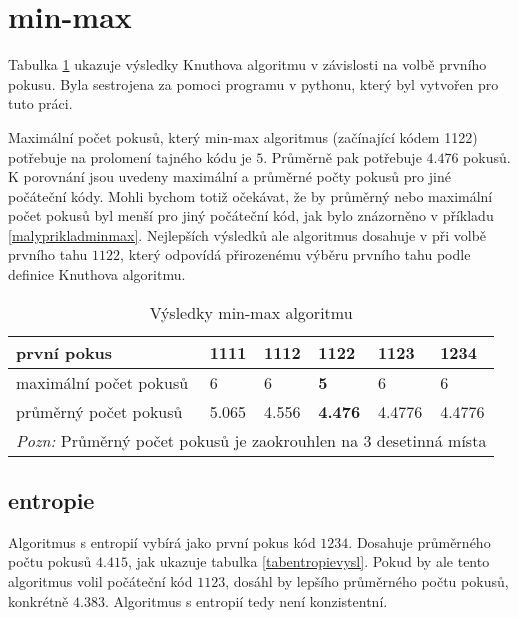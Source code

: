 \section{min-max}

Tabulka \ref{tabminmaxvysl} ukazuje výsledky Knuthova algoritmu v závislosti na volbě prvního pokusu. Byla sestrojena za pomoci programu v pythonu, který byl vytvořen pro tuto práci. \cite{Simsa_Strategies_for_Mastermind_2025} 

Maximální počet pokusů, který min-max algoritmus (začínající kódem 1122) potřebuje na prolomení tajného kódu je $5$. Průměrně pak potřebuje $4.476$ pokusů. K porovnání jsou uvedeny maximální a průměrné počty pokusů pro jiné počáteční kódy. Mohli bychom totiž očekávat, že by průměrný nebo maximální počet pokusů byl menší pro jiný počáteční kód, jak bylo znázorněno v příkladu \ref{malyprikladminmax}. Nejlepších výsledků ale algoritmus dosahuje v při volbě prvního tahu $1122$, který odpovídá přirozenému výběru prvního tahu podle definice Knuthova algoritmu. 

\begin{table}[h]
\centering
\begin{tabular}{l l l l l l}
\toprule
první pokus & 1111 & 1112 & \textbf{1122} & 1123 & 1234 \\
\midrule

maximální počet pokusů 
& 6 & 6 & \textbf{5} & 6 & 6 \\

průměrný počet pokusů 
& 5.065 & 4.556 & \textbf{4.476} & 4.4776 & 4.4776\\
\bottomrule
\multicolumn{6}{l}{\footnotesize \textit{Pozn:}
Průměrný počet pokusů je zaokrouhlen na $3$ desetinná místa}
\end{tabular}
\caption{Výsledky min-max algoritmu}\label{tabminmaxvysl}
\end{table}

\subsection{entropie}

Algoritmus s entropií vybírá jako první pokus kód $1234$. Dosahuje průměrného počtu pokusů $4.415$, jak ukazuje tabulka \ref{tabentropievysl}. Pokud by ale tento algoritmus volil počáteční kód $1123$, dosáhl by lepšího průměrného počtu pokusů, konkrétně $4.383$. Algoritmus s entropií tedy není konzistentní. 

